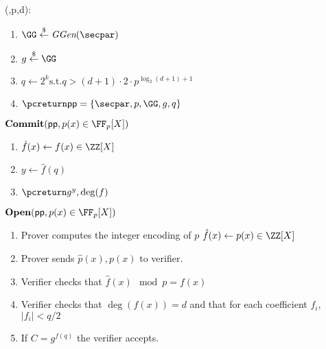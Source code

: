 \documentclass{article}
\begin{document}
\begin{mdframed}[userdefinedwidth=0.8\textwidth]
\begin{minipage}{\textwidth}
	\begin{flushleft}
	\setup(\secpar,p,d):
		\begin{enumerate}[nolistsep]
			\item $ \GG \sample \ggen(\secpar)$
			\item $ g \sample \GG$
			\item $q\gets 2^k \text{s.t.} q>(d+1) \cdot 2\cdot p^{\log_2(d+1)+1} $
			\item $\pcreturn \crs=\{\secpar,p,\GG,g,q\}$
		\end{enumerate}
		$\commit(\crs,p(x)\in \FF_p[X])$
		\begin{enumerate}[nolistsep]
			\item 	$\hat{f}(x)\gets f(x) \in \ZZ[X]$
			\item $y\gets \hat{f}(q)$
			\item $\pcreturn g^y,\deg(f)$
		\end{enumerate}
		$\open(\crs,p(x)\in \FF_p[X])$
		\begin{enumerate}[nolistsep]
			\item Prover computes the integer encoding of $p$ $\hat{f}(x)\gets p(x) \in \ZZ[X]$
			\item Prover sends $\hat{p}(x),p(x)$ to verifier.
			\item Verifier checks that $\hat{f}(x) \mod p=f(x)$
			\item Verifier checks that $\deg(f(x))=d$ and that for each coefficient $f_i$, $|f_i|< q/2$
			\item If $C=g^{f(q)}$ the verifier accepts.
		\end{enumerate}
	\end{flushleft}
	
\end{minipage}
\end{mdframed}
\end{document}
